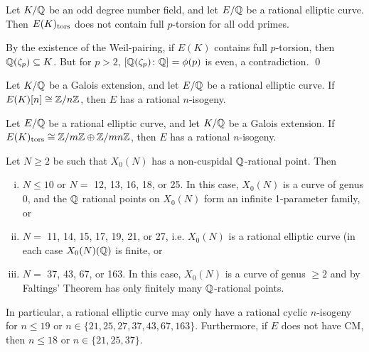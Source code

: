 \begin{frame}[plain]
\footnotesize
\phantom{.} \vfill
\begin{lem}
Let $K/\mathbb{Q}$ be an odd degree number field, and let $E/\mathbb{Q}$ be a rational elliptic curve. Then $E(K)_{\text{tors}}$ does not contain full $p$-torsion for all odd primes.
\end{lem}

\pf By the existence of the Weil-pairing, if $E(K)$ contains full $p$-torsion, then $\mathbb{Q}(\zeta_p) \subseteq K$. But for $p > 2$, $[\mathbb{Q}(\zeta_p) \colon \mathbb{Q}]= \phi(p)$ is even, a contradiction. \hfill \qed \vfill
\end{frame}



\begin{frame}[plain]
\footnotesize
\begin{lem}
Let $K/\mathbb{Q}$ be a Galois extension, and let $E/\mathbb{Q}$ be a rational elliptic curve. If $E(K)[n] \cong \mathbb{Z}/n\mathbb{Z}$, then $E$ has a rational $n$-isogeny. 
\end{lem} \vfill

\begin{lem}
Let $E/\mathbb{Q}$ be a rational elliptic curve, and let $K/\mathbb{Q}$ be a Galois extension. If $E(K)_{\text{tors}} \cong \mathbb{Z}/m\mathbb{Z} \oplus \mathbb{Z}/mn\mathbb{Z}$, then $E$ has a rational $n$-isogeny. 
\end{lem} \vfill

\begin{thm}
Let $N \geq 2$ be such that $X_0(N)$ has a non-cuspidal $\mathbb{Q}$-rational point. Then
	\begin{enumerate}[(i)]
	\item $N \leq 10$ or $N=$ 12, 13, 16, 18, or 25. In this case, $X_0(N)$ is a curve of genus 0, and the $\mathbb{Q}$ rational points on $X_0(N)$ form an infinite 1-parameter family, or
	\item $N=$ 11, 14, 15, 17, 19, 21, or 27, i.e. $X_0(N)$ is a rational elliptic curve (in each case $X_0(N)(\mathbb{Q})$ is finite, or
	\item $N=$ 37, 43, 67, or 163. In this case, $X_0(N)$ is a curve of genus $\geq 2$ and by Faltings' Theorem has only finitely many $\mathbb{Q}$-rational points. 
	\end{enumerate}
In particular, a rational elliptic curve may only have a rational cyclic $n$-isogeny for $n \leq 19$ or $n \in \{ 21, 25, 27, 37, 43, 67,163\}$. Furthermore, if $E$ does not have CM, then $n \leq 18$ or $n \in \{ 21, 25, 37 \}$.
\end{thm}
\end{frame}



